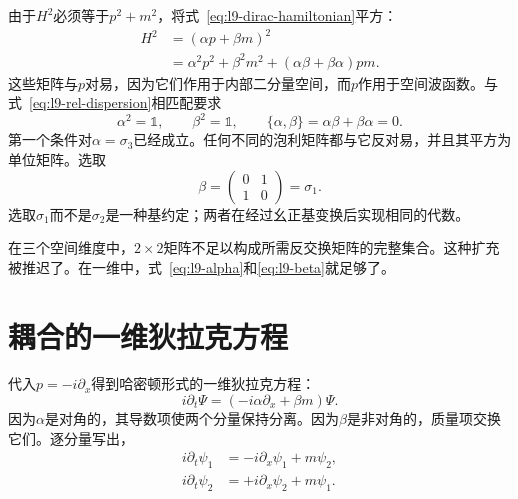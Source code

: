 由于\(H^2\)必须等于\(p^2+m^2\)，将式~\eqref{eq:l9-dirac-hamiltonian}平方：
\begin{align}
H^2
&=(\alpha p+\beta m)^2\\
&=\alpha^2p^2+\beta^2m^2
+(\alpha\beta+\beta\alpha)pm.
\label{eq:l9-square-dirac}
\end{align}
这些矩阵与\(p\)对易，因为它们作用于内部二分量空间，而\(p\)作用于空间波函数。与式~\eqref{eq:l9-rel-dispersion}相匹配要求
\begin{equation}
\alpha^2=\mathbb{1},
\qquad
\beta^2=\mathbb{1},
\qquad
\{\alpha,\beta\}
=\alpha\beta+\beta\alpha=0.
\label{eq:l9-dirac-algebra}
\end{equation}
第一个条件对\(\alpha=\sigma_3\)已经成立。任何不同的泡利矩阵都与它反对易，并且其平方为单位矩阵。选取
\begin{equation}
\beta=
\begin{pmatrix}
0&1\\
1&0
\end{pmatrix}
=\sigma_1.
\label{eq:l9-beta}
\end{equation}
选取\(\sigma_1\)而不是\(\sigma_2\)是一种基约定；两者在经过幺正基变换后实现相同的代数。

\begin{classroomqa}
\end{classroomqa}

\begin{classroomqa}
\end{classroomqa}

在三个空间维度中，\(2\times2\)矩阵不足以构成所需反交换矩阵的完整集合。这种扩充被推迟了。在一维中，式~\eqref{eq:l9-alpha}和\eqref{eq:l9-beta}就足够了。

\section{耦合的一维狄拉克方程}

代入\(p=-i\partial_x\)得到哈密顿形式的一维狄拉克方程：
\begin{equation}
i\partial_t\Psi
=\left(-i\alpha\partial_x+\beta m\right)\Psi.
\label{eq:l9-one-dimensional-dirac}
\end{equation}
因为\(\alpha\)是对角的，其导数项使两个分量保持分离。因为\(\beta\)是非对角的，质量项交换它们。逐分量写出，
\begin{align}
i\partial_t\psi_1
&=-i\partial_x\psi_1+m\psi_2,
\label{eq:l9-dirac-component-one}\\
i\partial_t\psi_2
&=+i\partial_x\psi_2+m\psi_1.
\label{eq:l9-dirac-component-two}
\end{align}

